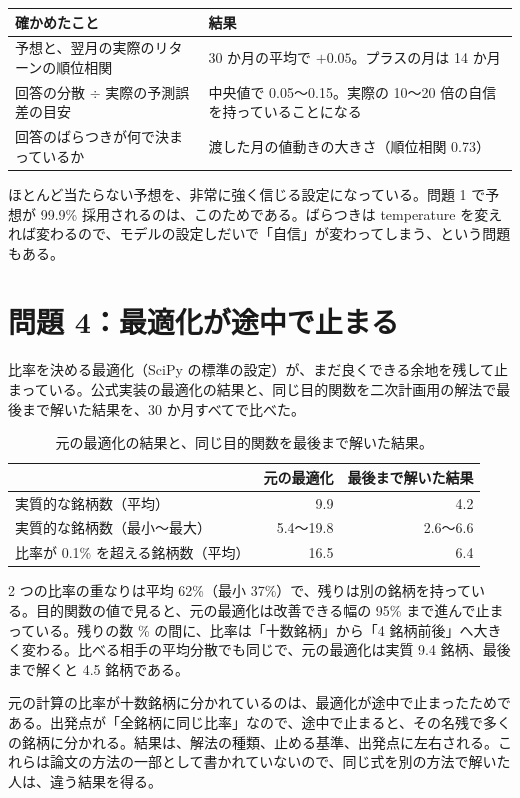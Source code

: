 \documentclass[xelatex,ja=standard,jafont=hiragino-pron,a4paper,10pt]{bxjsreport}
\begin{document}
\begin{longtable}{p{8.40cm}p{6.00cm}}
\toprule
\textbf{確かめたこと} & \textbf{結果} \\
\midrule
\endfirsthead
\bottomrule
\endfoot
予想と、翌月の実際のリターンの順位相関 & 30 か月の平均で $+0.05$。プラスの月は 14 か月 \\
回答の分散 $\div$ 実際の予測誤差の目安 & 中央値で 0.05〜0.15。実際の 10〜20 倍の自信を持っていることになる \\
回答のばらつきが何で決まっているか & 渡した月の値動きの大きさ（順位相関 0.73） \\
\end{longtable}

ほとんど当たらない予想を、非常に強く信じる設定になっている。問題 1 で予想が 99.9\% 採用されるのは、このためである。ばらつきは temperature を変えれば変わるので、モデルの設定しだいで「自信」が変わってしまう、という問題もある。

\section{問題 4：最適化が途中で止まる}

比率を決める最適化（SciPy の標準の設定）が、まだ良くできる余地を残して止まっている。公式実装の最適化の結果と、同じ目的関数を二次計画用の解法で最後まで解いた結果を、30 か月すべてで比べた。

\begin{table}[htbp]
\centering
\caption{元の最適化の結果と、同じ目的関数を最後まで解いた結果。}
\small
\begin{tabular}{lrr}
\toprule
 & 元の最適化 & 最後まで解いた結果 \\
\midrule
実質的な銘柄数（平均） & 9.9 & 4.2 \\
実質的な銘柄数（最小〜最大） & 5.4〜19.8 & 2.6〜6.6 \\
比率が 0.1\% を超える銘柄数（平均） & 16.5 & 6.4 \\
\bottomrule
\end{tabular}
\end{table}

2 つの比率の重なりは平均 62\%（最小 37\%）で、残りは別の銘柄を持っている。目的関数の値で見ると、元の最適化は改善できる幅の 95\% まで進んで止まっている。残りの数 \% の間に、比率は「十数銘柄」から「4 銘柄前後」へ大きく変わる。比べる相手の平均分散でも同じで、元の最適化は実質 9.4 銘柄、最後まで解くと 4.5 銘柄である。

元の計算の比率が十数銘柄に分かれているのは、最適化が途中で止まったためである。出発点が「全銘柄に同じ比率」なので、途中で止まると、その名残で多くの銘柄に分かれる。結果は、解法の種類、止める基準、出発点に左右される。これらは論文の方法の一部として書かれていないので、同じ式を別の方法で解いた人は、違う結果を得る。
\end{document}
